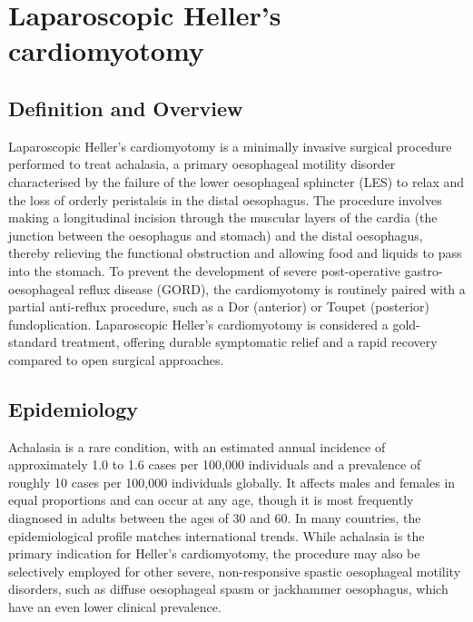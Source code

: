 \chapter{Laparoscopic Heller's cardiomyotomy}

\section*{Definition and Overview}
Laparoscopic Heller's cardiomyotomy is a minimally invasive surgical procedure performed to treat achalasia, a primary oesophageal motility disorder characterised by the failure of the lower oesophageal sphincter (LES) to relax and the loss of orderly peristalsis in the distal oesophagus. The procedure involves making a longitudinal incision through the muscular layers of the cardia (the junction between the oesophagus and stomach) and the distal oesophagus, thereby relieving the functional obstruction and allowing food and liquids to pass into the stomach. To prevent the development of severe post-operative gastro-oesophageal reflux disease (GORD), the cardiomyotomy is routinely paired with a partial anti-reflux procedure, such as a Dor (anterior) or Toupet (posterior) fundoplication. Laparoscopic Heller's cardiomyotomy is considered a gold-standard treatment, offering durable symptomatic relief and a rapid recovery compared to open surgical approaches.

\section*{Epidemiology}
Achalasia is a rare condition, with an estimated annual incidence of approximately 1.0 to 1.6 cases per 100,000 individuals and a prevalence of roughly 10 cases per 100,000 individuals globally. It affects males and females in equal proportions and can occur at any age, though it is most frequently diagnosed in adults between the ages of 30 and 60. In many countries, the epidemiological profile matches international trends. While achalasia is the primary indication for Heller's cardiomyotomy, the procedure may also be selectively employed for other severe, non-responsive spastic oesophageal motility disorders, such as diffuse oesophageal spasm or jackhammer oesophagus, which have an even lower clinical prevalence.

